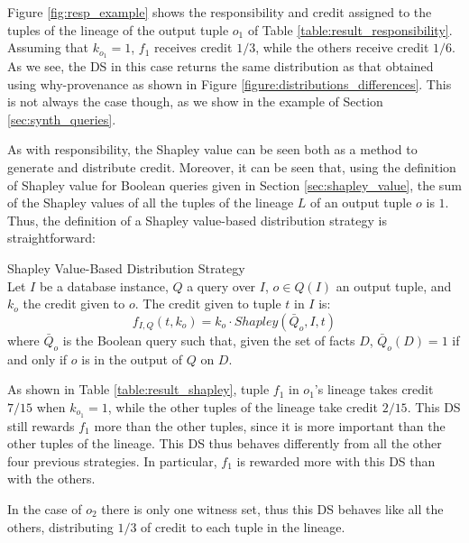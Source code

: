 Figure \ref{fig:resp_example} shows the responsibility and credit assigned to the tuples of the lineage of the output tuple $o_1$ of Table \ref{table:result_responsibility}. 
Assuming that $k_{o_1} = 1$, $f_1$ receives credit $1/3$, while the others receive credit $1/6$. 
As we see, the DS in this case returns the same distribution as that obtained using why-provenance as shown in Figure \ref{figure:distributions_differences}.
This is not always the case though, as we show in the example of Section \ref{sec:synth_queries}.


As with responsibility, the Shapley value can be seen both as a method to generate and distribute credit. Moreover, it can be seen that, using the definition of Shapley value for Boolean queries given in Section \ref{sec:shapley_value}, the sum of the Shapley values of all the tuples of the lineage $L$ of an output tuple $o$ is $1$. Thus, the definition of a Shapley value-based distribution strategy is straightforward:

\begin{definition}{Shapley Value-Based Distribution Strategy} \\
	Let $I$ be a database instance, $Q$ a query over $I$, $o \in Q(I)$ an output tuple, and $k_o$ the credit given to $o$. The credit given to tuple $t$ in $I$ is:
	\[
		f_{I, Q}(t, k_o) = k_o \cdot 
		Shapley(\bar{Q}_o, I, t)
	\] 
	where $\bar{Q}_o$ is the Boolean query such that, given the set of facts $D$, $\bar{Q}_o(D) = 1$ if and only if $o$ is in the output of $Q$ on $D$.
\end{definition}

As shown in Table \ref{table:result_shapley}, tuple $f_1$ in $o_1$'s lineage takes credit $7/15$ when $k_{o_1} = 1$, while the other tuples of the lineage take credit $2/15$. This DS still rewards $f_1$ more than the other tuples, since it is more important than the other tuples of the lineage. This DS thus behaves differently from all the other four previous strategies. In particular, $f_1$ is rewarded more with this DS than with the others.

In the case of $o_2$ there is only one witness set, thus this DS behaves like all the others, distributing $1/3$ of credit to each tuple in the lineage. 









